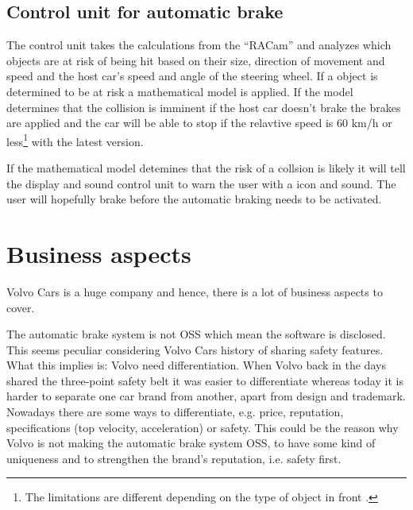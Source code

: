 \documentclass[conference]{IEEEtran}
\begin{document}
\subsection{Control unit for automatic brake}
The control unit takes the calculations from the ``RACam'' and analyzes which objects are at risk of being hit based on their size, direction of movement and speed and the host car's speed and angle of the steering wheel. If a object is determined to be at risk a mathematical model is applied. If the model determines that the collision is imminent if the host car doesn't brake the brakes are applied and the car will be able to stop if the relavtive speed is 60 km/h or less\footnote{The limitations are different depending on the type of object in front \cite{CitySafetyDefinition}.} with the latest version. \cite{SysDescription, CitySafetyDefinition}

If the mathematical model detemines that the risk of a collsion is likely it will tell the display and sound control unit to warn the user with a icon and sound. The user will hopefully brake before the automatic braking needs to be activated. \cite{CitySafetyDefinition}


\section{Business aspects}
Volvo Cars is a huge company and hence, there is a lot of business aspects to cover.

The automatic brake system is not OSS which mean the software is disclosed. This seems peculiar considering Volvo Cars history of sharing safety features. What this implies is: Volvo need differentiation. When Volvo back in the days shared the three-point safety belt it was easier to differentiate whereas today it is harder to separate one car brand from another, apart from design and trademark. Nowadays there are some ways to differentiate, e.g. price, reputation, specifications (top velocity, acceleration) or safety. This could be the reason why Volvo is not making the automatic brake system OSS, to have some kind of uniqueness and to strengthen the brand's reputation, i.e. safety first. \cite{VolvoVision}
\end{document}
